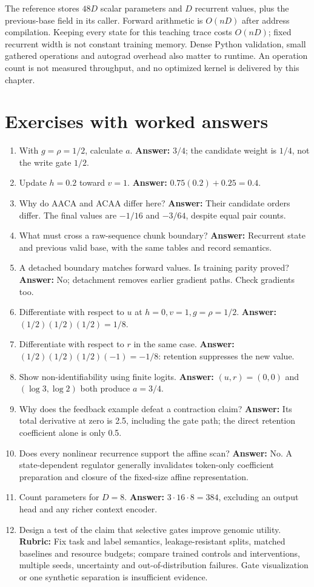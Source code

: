 The reference stores $48D$ scalar parameters and $D$ recurrent values, plus
the previous-base field in its caller. Forward arithmetic is $O(nD)$ after
address compilation. Keeping every state for this teaching trace costs $O(nD)$;
fixed recurrent width is not constant training memory. Dense Python validation,
small gathered operations and autograd overhead also matter to runtime.
An operation count is not measured throughput, and no optimized kernel is
delivered by this chapter.

\section{Exercises with worked answers}
\begin{enumerate}
\item With $g=\rho=1/2$, calculate $a$. \textbf{Answer:} $3/4$; the candidate
weight is $1/4$, not the write gate $1/2$.
\item Update $h=0.2$ toward $v=1$. \textbf{Answer:} $0.75(0.2)+0.25=0.4$.
\item Why do AACA and ACAA differ here? \textbf{Answer:} Their candidate
orders differ. The final values are $-1/16$ and $-3/64$, despite equal pair counts.
\item What must cross a raw-sequence chunk boundary? \textbf{Answer:} Recurrent
state and previous valid base, with the same tables and record semantics.
\item A detached boundary matches forward values. Is training parity proved?
\textbf{Answer:} No; detachment removes earlier gradient paths. Check gradients too.
\item Differentiate with respect to $u$ at $h=0,v=1,g=\rho=1/2$.
\textbf{Answer:} $(1/2)(1/2)(1/2)=1/8$.
\item Differentiate with respect to $r$ in the same case. \textbf{Answer:}
$(1/2)(1/2)(1/2)(-1)=-1/8$: retention suppresses the new value.
\item Show non-identifiability using finite logits. \textbf{Answer:}
$(u,r)=(0,0)$ and $(\log3,\log2)$ both produce $a=3/4$.
\item Why does the feedback example defeat a contraction claim?
\textbf{Answer:} Its total derivative at zero is 2.5, including the gate path;
the direct retention coefficient alone is only 0.5.
\item Does every nonlinear recurrence support the affine scan? \textbf{Answer:}
No. A state-dependent regulator generally invalidates token-only coefficient
preparation and closure of the fixed-size affine representation.
\item Count parameters for $D=8$. \textbf{Answer:} $3\cdot16\cdot8=384$,
excluding an output head and any richer context encoder.
\item Design a test of the claim that selective gates improve genomic utility.
\textbf{Rubric:} Fix task and label semantics, leakage-resistant splits,
matched baselines and resource budgets; compare trained controls and interventions,
multiple seeds, uncertainty and out-of-distribution failures. Gate visualization
or one synthetic separation is insufficient evidence.
\end{enumerate}

